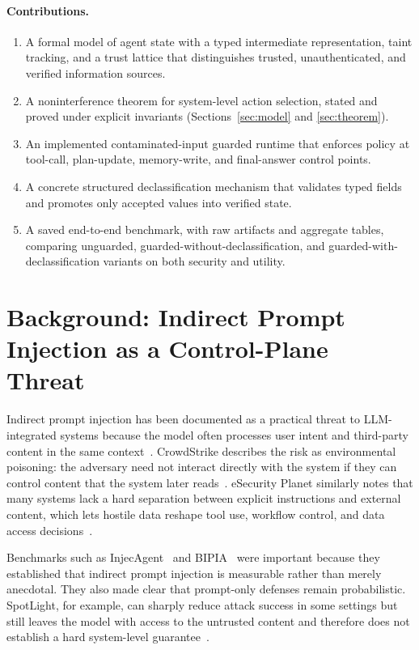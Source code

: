 \documentclass[11pt]{article}
\begin{document}
\paragraph{Contributions.}
\begin{enumerate}[label=(\roman*)]
  \item A formal model of agent state with a typed intermediate representation,
        taint tracking, and a trust lattice that distinguishes trusted,
        unauthenticated, and verified information sources.
  \item A noninterference theorem for system-level action selection, stated and
        proved under explicit invariants (Sections~\ref{sec:model} and
        \ref{sec:theorem}).
  \item An implemented contaminated-input guarded runtime that enforces policy
        at tool-call, plan-update, memory-write, and final-answer control
        points.
  \item A concrete structured declassification mechanism that validates typed
        fields and promotes only accepted values into verified state.
  \item A saved end-to-end benchmark, with raw artifacts and aggregate tables,
        comparing unguarded, guarded-without-declassification, and
        guarded-with-declassification variants on both security and utility.
\end{enumerate}

\section{Background: Indirect Prompt Injection as a Control-Plane Threat}
\label{sec:background}

Indirect prompt injection has been documented as a practical threat to
LLM-integrated systems because the model often processes user intent and
third-party content in the same context~\cite{greshake2023,crowdstrike2025}.
CrowdStrike describes the risk as environmental poisoning: the adversary need
not interact directly with the system if they can control content that the
system later reads~\cite{crowdstrike2025}. eSecurity Planet similarly notes
that many systems lack a hard separation between explicit instructions and
external content, which lets hostile data reshape tool use, workflow control,
and data access decisions~\cite{esecplanet2025}.

Benchmarks such as InjecAgent~\cite{zhan2024injecagent} and
BIPIA~\cite{yi2023bipia} were important because they established that indirect
prompt injection is measurable rather than merely anecdotal. They also made
clear that prompt-only defenses remain probabilistic. SpotLight, for example,
can sharply reduce attack success in some settings but still leaves the model
with access to the untrusted content and therefore does not establish a hard
system-level guarantee~\cite{hines2024spotlight}.
\end{document}
